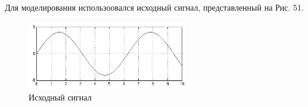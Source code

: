 \documentclass[10pt,a4paper]{article}
\begin{document}
Для моделирования использоовался исходный сигнал, представленный на Рис. 51.

\begin{figure}[h]\centering
    \includegraphics[width=7cm]{sim_y} 
    \caption{Исходный сигнал}\label{fig.sim_y}
\end{figure}                                                                                                                                                                                                                                                                                                                                                                                                                                                                                                                                                                                                                                                                                                                                                                                                                                                                                                                                                                                                                                                                                                                                                                                                                                                                                                                                                                                                                                                                       
\FloatBarrier
\end{document}
